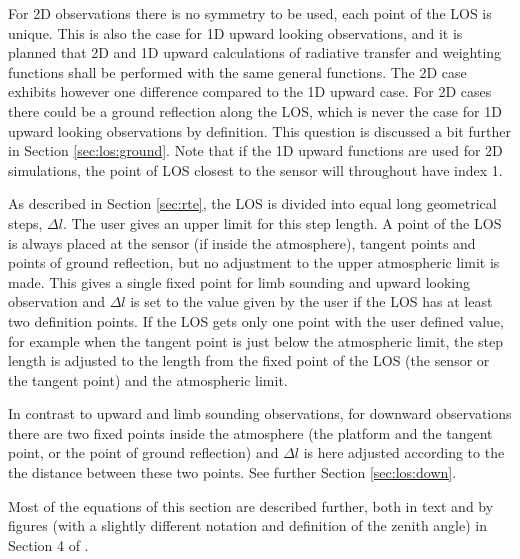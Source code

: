  For 2D observations there is no symmetry to be used, each point of
 the LOS is unique. This is also the case for 1D upward looking
 observations, and it is planned that 2D and 1D upward calculations of
 radiative transfer and weighting functions shall be performed with
 the same general functions.  The 2D case exhibits however one
 difference compared to the 1D upward case. For 2D cases there could
 be a ground reflection along the LOS, which is never the case for 1D
 upward looking observations by definition. This question is discussed
 a bit further in Section \ref{sec:los:ground}. Note that if the 1D
 upward functions are used for 2D simulations, the point of LOS
 closest to the sensor will throughout have index 1.


 
 \label{sec:rte:stepl}
 
 As described in Section \ref{sec:rte}, the LOS is divided into equal
 long geometrical steps, $\Delta l$. The user gives an upper limit for
 this step length. A point of the LOS is always placed at the sensor
 (if inside the atmosphere), tangent points and points of ground
 reflection, but no adjustment to the upper atmospheric limit is made.
 This gives a single fixed point for limb sounding and upward looking
 observation and $\Delta l$ is set to the value given by the user if
 the LOS has at least two definition points. If the LOS gets only one
 point with the user defined value, for example when the tangent point
 is just below the atmospheric limit, the step length is adjusted to
 the length from the fixed point of the LOS (the sensor or the tangent 
 point) and the atmospheric limit.
 
 In contrast to upward and limb sounding observations, for downward
 observations there are two fixed points inside the atmosphere (the
 platform and the tangent point, or the point of ground reflection)
 and $\Delta l$ is here adjusted according to the the distance between
 these two points. See further Section \ref{sec:los:down}.



  
 Most of the equations of this section are described further, both in text
 and by figures (with a slightly different notation and definition
 of the zenith angle) in Section 4 of \citet{eriksson:97a}.

  \label{sec:los:up}
  

